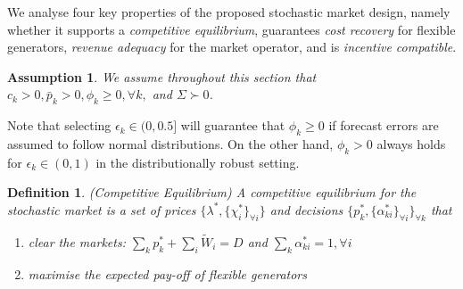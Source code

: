 \documentclass{article}
\newtheorem{definition}{Definition}
\newtheorem{assumption}{Assumption}
\begin{document}
We analyse four key properties of the proposed stochastic market design, namely whether it supports a \textit{competitive equilibrium}, guarantees \textit{cost recovery} for flexible generators, \textit{revenue adequacy} for the market operator, and is \textit{incentive compatible}.

\begin{assumption}\label{strictconvexity}
We assume throughout this section that $c_k > 0, \bar{p}_k > 0, \phi_k \ge 0, \forall k,$ and $\Sigma \succ 0$.
\end{assumption}

Note that selecting $\epsilon_k \in (0, 0.5]$ will guarantee that $\phi_k \ge 0$ if forecast errors are assumed to follow normal distributions. On the other hand, $\phi_k > 0$ always holds for $\epsilon_k \in (0, 1)$ in the distributionally robust setting.

\begin{definition}
(Competitive Equilibrium) A competitive equilibrium for the stochastic market is a set of prices $\{\lambda^*, \{\chi_i^*\}_{\forall i}\}$ and decisions $\{p_k^*, \{\alpha_{ki}^*\}_{\forall i}\}_{\forall k}$ that\vspace{-5pt}
\begin{enumerate}
\item clear the markets: $\sum_k p_k^* + \sum_i \tilde{W}_i = D$ and $\sum_k \alpha_{ki}^* = 1, \forall i$\vspace{-5pt}
\item maximise the expected pay-off of flexible generators
\end{enumerate}
\end{definition}
\end{document}
